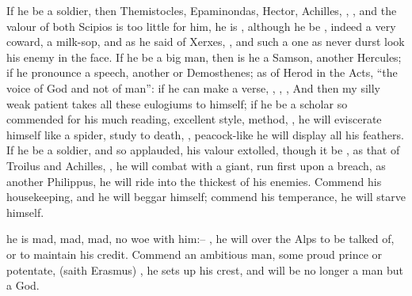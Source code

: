 If he be a soldier, then Themistocles, Epaminondas, Hector, Achilles, , \etc{}, and the valour of both Scipios is
too little for him, he is , although he be , indeed a
very coward, a milk-sop, and as he said of Xerxes,
, and such a one as never durst look his
enemy in the face. If he be a big man, then is he a Samson, another Hercules;
if he pronounce a speech, another \Tully{} or Demosthenes; as of Herod in the
Acts, \enquote{the voice of God and not of man}: if he can make a verse, \Homer{}, \Virgil{},
\etc{}, And then my silly weak patient takes all these eulogiums to himself; if
he be a scholar so commended for his much reading, excellent style, method,
\etc{}, he will eviscerate himself like a spider, study to death, , peacock-like he will display all his feathers.
If he be a soldier, and so applauded, his valour extolled, though it be
, as that of Troilus and Achilles, , he
will combat with a giant, run first upon a breach, as another
Philippus, he will ride into the thickest of his enemies.
Commend his housekeeping, and he will beggar himself; commend his temperance,
he will starve himself.

%
he is mad, mad, mad, no woe with him:-- , he will
over the Alps to be talked of, or to maintain his credit.
Commend an ambitious man, some proud prince or potentate,  (saith Erasmus) , he sets up his crest, and will be no longer a man but
a God.


